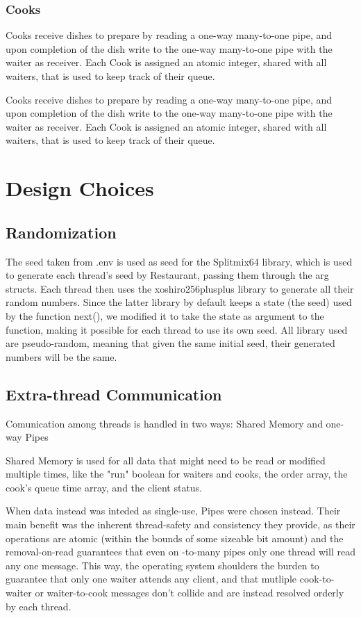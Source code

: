 \documentclass{article}
\begin{document}
\subsubsection{Cooks}
Cooks receive dishes to prepare by reading a one-way many-to-one pipe, and upon completion of the dish write to the one-way many-to-one pipe with the waiter as receiver.
Each Cook is assigned an atomic integer, shared with all waiters, that is used to keep track of their queue.

Cooks receive dishes to prepare by reading a one-way many-to-one pipe, and upon completion of the dish write to the one-way many-to-one pipe with the waiter as receiver.
Each Cook is assigned an atomic integer, shared with all waiters, that is used to keep track of their queue.


\section{Design Choices}
\subsection{Randomization}
The seed taken from .env is used as seed for the Splitmix64 library, which is used to generate each thread's seed by Restaurant, passing them through the arg structs. Each thread then uses the xoshiro256plusplus library to generate all their random numbers. Since the latter library by default keeps a state (the seed) used by the function next(), we modified it to take the state as argument to the function, making it possible for each thread to use its own seed.
All library used are pseudo-random, meaning that given the same initial seed, their generated numbers will be the same.

\subsection{Extra-thread Communication}
Comunication among threads is handled in two ways: Shared Memory and one-way Pipes

Shared Memory is used for all data that might need to be read or modified multiple times, like the "run" boolean for waiters and cooks, the order array, the cook's queue time array, and the client status.

When data instead was inteded as single-use, Pipes were chosen instead. Their main benefit was the inherent thread-safety and consistency they provide, as their operations are atomic (within the bounds of some sizeable bit amount) and the removal-on-read guarantees that even on -to-many pipes only one thread will read any one message.
This way, the operating system shoulders the burden to guarantee that only one waiter attends any client, and that mutliple cook-to-waiter or waiter-to-cook messages don't collide and are instead resolved orderly by each thread.
\end{document}
